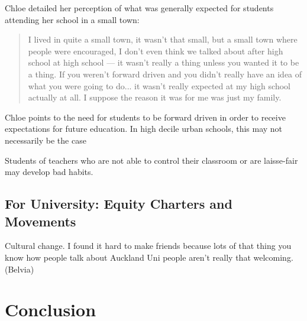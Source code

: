 Chloe detailed her perception of what was generally expected for students attending her school in a small town:
\blockquote{I lived in quite a small town, it wasn't that small, but a small town where people were encouraged, I don’t even think we talked about after high school at high school --- it wasn't really a thing unless you wanted it to be a thing. If you weren't forward driven and you didn't really have an idea of what you were going to do... it wasn't really expected at my high school actually at all. I suppose the reason it was for me was just my family.} Chloe points to the need for students to be forward driven in order to receive expectations for future education. In high decile urban schools, this may not necessarily be the case

Students of teachers who are not able to control their classroom or are laisse-fair may develop bad habits. 



\subsection{For University: Equity Charters and Movements}
Cultural change. I found it hard to make friends because lots of that thing you know how people talk about Auckland Uni people aren’t really that welcoming. (Belvia)

\section{Conclusion}


